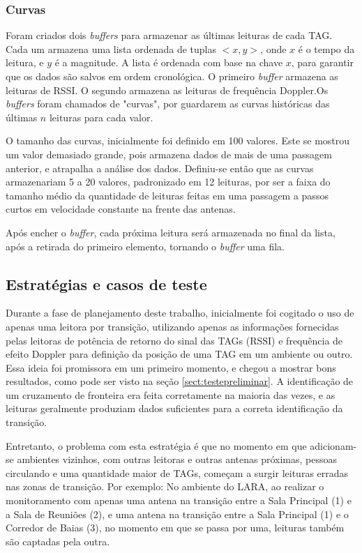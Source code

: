  \subsubsection{Curvas} \label{section:curvas}
 
 Foram criados dois \textit{buffers} para armazenar as últimas leituras de cada TAG. Cada um armazena uma lista ordenada de tuplas $<x,y>$, onde $x$ é o tempo da leitura, e $y$ é a magnitude. A lista é ordenada com base na chave $x$, para garantir que os dados são salvos em ordem cronológica. O primeiro \textit{buffer} armazena as leituras de RSSI. O segundo armazena as leituras de frequência Doppler.Os \textit{buffers} foram chamados de "curvas", por guardarem as curvas históricas das últimas $n$ leituras para cada valor.
 
 O tamanho das curvas, inicialmente foi definido em 100 valores. Este se mostrou um valor demasiado grande, pois armazena dados de mais de uma passagem anterior, e atrapalha a análise dos dados. Definiu-se então que as curvas armazenariam 5 a 20 valores, padronizado em 12 leituras, por ser a faixa do tamanho médio da quantidade de leituras feitas em uma passagem a passos curtos em velocidade constante na frente das antenas.
 
 Após encher o \textit{buffer}, cada próxima leitura será armazenada no final da lista, após a retirada do primeiro elemento, tornando o \textit{buffer} uma fila.

 
 \subsection{Estratégias e casos de teste} \label{section:estrategias}

 Durante a fase de planejamento deste trabalho, inicialmente foi cogitado o uso de apenas uma leitora por transição, utilizando apenas as informações fornecidas pelas leitoras de potência de retorno do sinal das TAGs (RSSI) e frequência de efeito Doppler para definição da posição de uma TAG em um ambiente ou outro. Essa ideia foi promissora em um primeiro momento, e chegou a mostrar bons resultados, como pode ser visto na seção \ref{sect:testepreliminar}. A identificação de um cruzamento de fronteira era feita corretamente na maioria das vezes, e as leituras geralmente produziam dados suficientes para a correta identificação da transição.
 
 Entretanto, o problema com esta estratégia é que no momento em que adicionam-se ambientes vizinhos, com outras leitoras e outras antenas próximas, pessoas circulando e uma quantidade maior de TAGs, começam a surgir leituras erradas nas zonas de transição. Por exemplo: No ambiente do LARA, ao realizar o monitoramento com apenas uma antena na transição entre a Sala Principal (1) e a Sala de Reuniões (2), e uma antena na transição entre a Sala Principal (1) e o Corredor de Baias (3), no momento em que se passa por uma, leituras também são captadas pela outra. 
 
